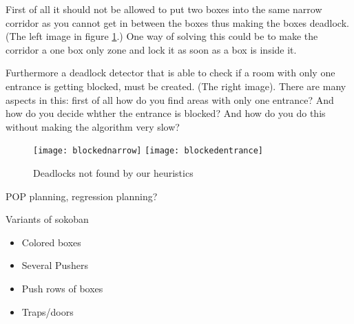 First of all it should not be allowed to put two boxes into the same
narrow corridor as you cannot get in between the boxes thus making the
boxes deadlock. (The left image in figure \ref{fig:missingdeadlocks}.)
One way of solving this could be to make the corridor a one box only
zone and lock it as soon as a box is inside it.

Furthermore a deadlock detector that is able to check if a room with
only one entrance is getting blocked, must be created. (The right
image). There are many aspects in this: first of all how do you find
areas with only one entrance? And how do you decide whther the
entrance is blocked? And how do you do this without making the
algorithm very slow?

\begin{figure}[htp]
  \centering
  \texttt{[image: blockednarrow]}
  \texttt{[image: blockedentrance]}
  \caption{Deadlocks not found by our heuristics}
  \label{fig:missingdeadlocks}
\end{figure}


POP planning, regression planning?

Variants of sokoban
\begin{itemize}
\item Colored boxes
\item Several Pushers
\item Push rows of boxes
\item Traps/doors
\end{itemize}
